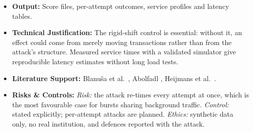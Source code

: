 \documentclass[11pt,a4paper]{article}
\begin{document}
\begin{itemize}[leftmargin=*]
\begin{enumerate}[leftmargin=*]
    \end{enumerate}
    \item \textbf{Output:} Score files, per-attempt outcomes, service profiles and latency tables.
    \item \textbf{Technical Justification:} The rigid-shift control is essential: without it, an effect could come from merely moving transactions rather than from the attack's structure. Measured service times with a validated simulator give reproducible latency estimates without long load tests.
    \item \textbf{Literature Support:} Blanu\v{s}a et al.\ \cite{blanusa2024gfp}, Abolfadl \cite{abolfadl2026kontograph}, Heijmans et al.\ \cite{heijmans2026robust}.
    \item \textbf{Risks \& Controls:} \textit{Risk:} the attack re-times every attempt at once, which is the most favourable case for bursts sharing background traffic. \textit{Control:} stated explicitly; per-attempt attacks are planned. \textit{Ethics:} synthetic data only, no real institution, and defences reported with the attack.
\end{itemize}

\end{document}
